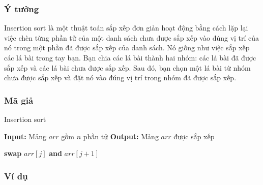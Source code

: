 \subsubsection{Ý tưởng}
Insertion sort là một thuật toán sắp xếp đơn giản hoạt động bằng cách lặp lại việc chèn từng phần tử của một danh sách chưa được sắp xếp vào đúng vị trí của nó trong một phần đã được sắp xếp của danh sách. Nó giống như việc sắp xếp các lá bài trong tay bạn. Bạn chia các lá bài thành hai nhóm: các lá bài đã được sắp xếp và các lá bài chưa được sắp xếp. Sau đó, bạn chọn một lá bài từ nhóm chưa được sắp xếp và đặt nó vào đúng vị trí trong nhóm đã được sắp xếp.
\subsubsection{Mã giả}

\begin{algorithm}[H]
\caption{Insertion sort}
\begin{algorithmic}[1]
    \State \textbf{Input:} Mảng $arr$ gồm $n$ phần tử
    \State \textbf{Output:} Mảng $arr$ được sắp xếp
    
                \State \textbf{swap} $arr[j]$ \textbf{and} $arr[j+1]$
            \EndIf
        \EndFor
    \EndFor
\EndProcedure
\end{algorithmic}
\end{algorithm}

\subsubsection{Ví dụ}

